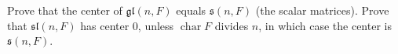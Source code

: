 Prove that the center of $\mathfrak{gl}(n, F)$ equals $\mathfrak{s}(n, F)$ (the scalar matrices). Prove that $\mathfrak{sl}(n, F)$ has center $0$, unless $\operatorname{char} F$ divides $n$, in which case the center is $\mathfrak{s}(n, F)$.

